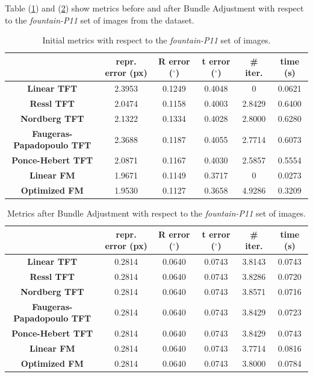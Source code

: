 Table (\ref{tab:fountainInit}) and (\ref{tab:fountainBA}) show metrics before and after Bundle Adjustment with respect to the \textit{fountain-P11} set of images from the dataset.

\begin{table}[htbp]
  \centering
  \caption{Initial metrics with respect to the \textit{fountain-P11} set of images.}
  \label{tab:fountainInit}
  \begin{tabular}{|*{6}{c}|}
    \hline
     & repr. error (px) & R error ($^{\circ}$) & t error ($^{\circ}$) & \# iter. & time (s)\\
    \hline
    \textbf{Linear TFT} & 2.3953 & 0.1249 & 0.4048 & 0 & 0.0621 \\
    \textbf{Ressl TFT} & 2.0474 & 0.1158 & 0.4003 & 2.8429 & 0.6400 \\
    \textbf{Nordberg TFT} & 2.1322 & 0.1334 & 0.4028 & 2.8000 & 0.6280 \\
    \textbf{Faugeras-Papadopoulo TFT} & 2.3688 & 0.1187 & 0.4055 & 2.7714 & 0.6073 \\
    \textbf{Ponce-Hebert TFT} & 2.0871 & 0.1167 & 0.4030 & 2.5857 & 0.5554 \\
    \textbf{Linear FM} & 1.9671 & 0.1149 & 0.3717 & 0 & 0.0273 \\
    \textbf{Optimized FM} & 1.9530 & 0.1127 & 0.3658 & 4.9286 & 0.3209 \\
    \hline
  \end{tabular}
\end{table}

\begin{table}[htbp]
  \centering
  \caption{Metrics after Bundle Adjustment with respect to the \textit{fountain-P11} set of images.}
  \label{tab:fountainBA}
  \begin{tabular}{|*{6}{c}|}
    \hline
     & repr. error (px) & R error ($^{\circ}$) & t error ($^{\circ}$) & \# iter. & time (s)\\
     \hline
    \textbf{Linear TFT} & 0.2814 & 0.0640 & 0.0743 & 3.8143 & 0.0743 \\
    \textbf{Ressl TFT} & 0.2814 & 0.0640 & 0.0743 & 3.8286 & 0.0720 \\
    \textbf{Nordberg TFT} & 0.2814 & 0.0640 & 0.0743 & 3.8571 & 0.0716 \\
    \textbf{Faugeras-Papadopoulo TFT} & 0.2814 & 0.0640 & 0.0743 & 3.8429 & 0.0723 \\
    \textbf{Ponce-Hebert TFT} & 0.2814 & 0.0640 & 0.0743 & 3.8429 & 0.0743 \\
    \textbf{Linear FM} & 0.2814 & 0.0640 & 0.0743 & 3.7714 & 0.0816 \\
    \textbf{Optimized FM} & 0.2814 & 0.0640 & 0.0743 & 3.8000 & 0.0784 \\
    \hline
  \end{tabular}
\end{table}

